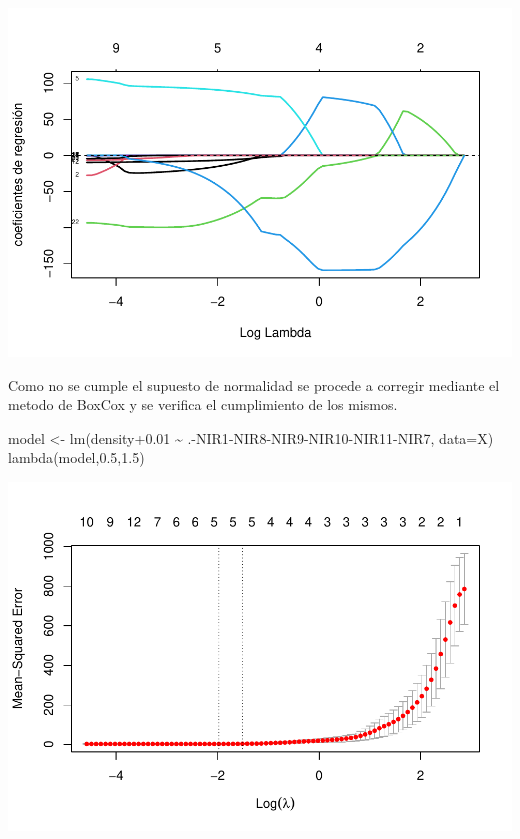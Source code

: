 \documentclass[
]{article}
\newenvironment{Shaded}{\begin{snugshade}}{\end{snugshade}}
\newcommand{\AttributeTok}[1]{\textcolor[rgb]{0.77,0.63,0.00}{#1}}
\newcommand{\FloatTok}[1]{\textcolor[rgb]{0.00,0.00,0.81}{#1}}
\newcommand{\FunctionTok}[1]{\textcolor[rgb]{0.00,0.00,0.00}{#1}}
\newcommand{\NormalTok}[1]{#1}
\newcommand{\OtherTok}[1]{\textcolor[rgb]{0.56,0.35,0.01}{#1}}
\newcommand{\SpecialCharTok}[1]{\textcolor[rgb]{0.00,0.00,0.00}{#1}}
\begin{document}
\includegraphics{Taller-2-Regresion-Multiple-Aplicada_files/figure-latex/unnamed-chunk-6-1.pdf}

Como no se cumple el supuesto de normalidad se procede a corregir
mediante el metodo de BoxCox y se verifica el cumplimiento de los
mismos.

\begin{Shaded}
\begin{Highlighting}[]
\NormalTok{model }\OtherTok{\textless{}{-}} \FunctionTok{lm}\NormalTok{(density}\FloatTok{+0.01} \SpecialCharTok{\textasciitilde{}}\NormalTok{ .}\SpecialCharTok{{-}}\NormalTok{NIR1}\SpecialCharTok{{-}}\NormalTok{NIR8}\SpecialCharTok{{-}}\NormalTok{NIR9}\SpecialCharTok{{-}}\NormalTok{NIR10}\SpecialCharTok{{-}}\NormalTok{NIR11}\SpecialCharTok{{-}}\NormalTok{NIR7, }\AttributeTok{data=}\NormalTok{X)}
\FunctionTok{lambda}\NormalTok{(model,}\FloatTok{0.5}\NormalTok{,}\FloatTok{1.5}\NormalTok{)}
\end{Highlighting}
\end{Shaded}

\includegraphics{Taller-2-Regresion-Multiple-Aplicada_files/figure-latex/unnamed-chunk-7-1.pdf}
\end{document}
